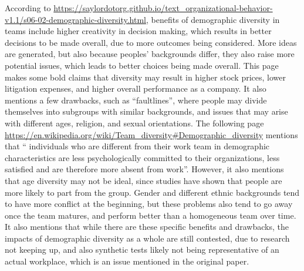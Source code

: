 \documentclass[letterpaper,12pt]{article}
\begin{document}
According to \url{https://saylordotorg.github.io/text_organizational-behavior-v1.1/s06-02-demographic-diversity.html},
benefits of demographic diversity in teams include higher creativity in decision making, which results in
better decisions to be made overall, due to more outcomes being considered. More ideas are generated, but also
because peoples' backgrounds differ, they also raise more potential issues, which leads to better choices being made overall.
This page makes some bold claims that diversity may result in higher stock prices, lower litigation expenses, and higher overall performance as a company. It also mentions a few drawbacks, such as ``faultlines'', where people may divide themselves
into subgroups with similar backgrounds, and issues that may arise with different ages, religion, and sexual orientations.
The following page \url{https://en.wikipedia.org/wiki/Team_diversity#Demographic_diversity} mentions that
`` individuals who are different from their work team in demographic characteristics are less psychologically committed to their organizations, less satisfied and are therefore more absent from work''. However, it also mentions that age diversity may not be
ideal, since studies have shown that people are more likely to part from the group. Gender and different ethnic backgrounds
tend to have more conflict at the beginning, but these problems also tend to go away once the team matures, and perform better
than a homogeneous team over time. It also mentions that while there are these specific benefits and drawbacks, the impacts
of demographic diversity as a whole are still contested, due to research not keeping up, and also synthetic tests
likely not being representative of an actual workplace, which is an issue mentioned in the original paper.
\end{document}
